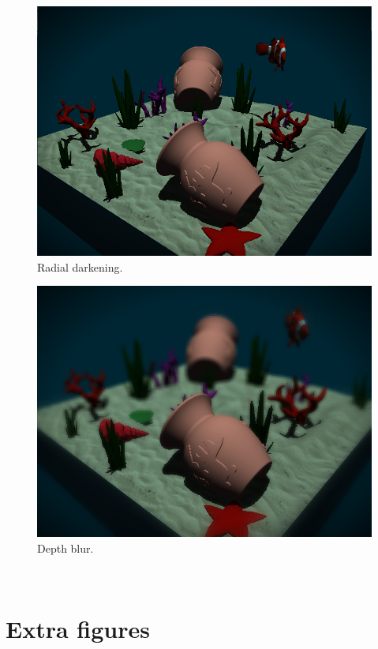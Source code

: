 \documentclass{article}
\begin{document}
\begin{figure}[h]
    \centering
    \includegraphics[width=\columnwidth]{imgs/blur_off.png}
    \caption{Radial darkening.}
    \label{fig:radial_darkening}
\end{figure}

\begin{figure}[h]
    \centering
    \includegraphics[width=\columnwidth]{imgs/blur_on.png}
    \caption{Depth blur.}
    \label{fig:blur}
\end{figure}

\newpage~\newpage
\appendix

\vfill %
\section{Extra figures}
\label{sec:appendix}
\end{document}
